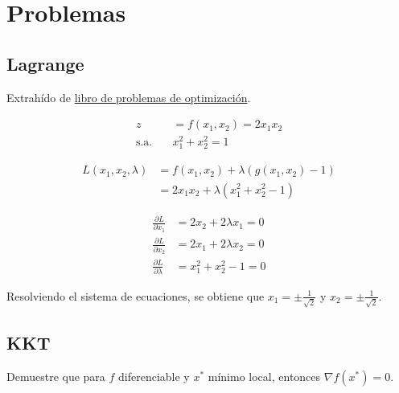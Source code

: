 \documentclass{article}
\newenvironment{question}
{\begin{mdframed}[backgroundcolor=white]}
{\end{mdframed}}
\newenvironment{solution}
{\begin{mdframed}[backgroundcolor=lightorange,hidealllines=true]}
{\end{mdframed}}
\begin{document}
\section{Problemas}

\subsection{Lagrange} \label{problemas:lagrangiano}

\begin{question}
    Extrahído de \href{https://www.bbau.ac.in/dept/UIET/EME-601%20Operation%20Research.pdf}{libro de problemas de optimización}.

    \begin{align*}
        z \quad           & =f(x_1,x_2)=2x_1x_2 \\
        \text{s.a.} \quad & x_1^2+x_2^2=1
    \end{align*}
\end{question}

\begin{solution}
    \begin{align*}
        L(x_1,x_2,\lambda) & = f(x_1,x_2) + \lambda(g(x_1,x_2)-1) \\
                           & = 2x_1x_2 + \lambda(x_1^2+x_2^2-1)
    \end{align*}

    \begin{align*}
        \frac{\partial L}{\partial x_1}     & = 2x_2 + 2\lambda x_1 = 0 \\
        \frac{\partial L}{\partial x_2}     & = 2x_1 + 2\lambda x_2 = 0 \\
        \frac{\partial L}{\partial \lambda} & = x_1^2 + x_2^2 - 1 = 0
    \end{align*}

    Resolviendo el sistema de ecuaciones, se obtiene que $x_1 = \pm \frac{1}{\sqrt{2}}$ y $x_2 = \pm \frac{1}{\sqrt{2}}$.
\end{solution}

\subsection{KKT} \label{problemas:kkt}
\begin{question}
    Demuestre que para $f$ diferenciable y $x^*$ mínimo local, entonces $\nabla f(x^*)=0$.
\end{question}
\end{document}
